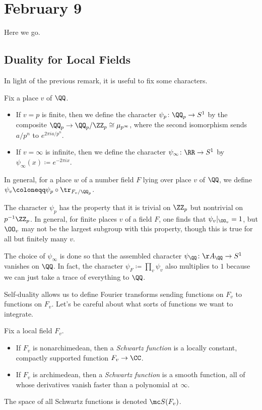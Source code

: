 \documentclass[../notes.tex]{subfiles}
\begin{document}
\section{February 9}
Here we go.

\subsection{Duality for Local Fields}
In light of the previous remark, it is useful to fix some characters.
\begin{notation}
	Fix a place $v$ of $\QQ$.
	\begin{itemize}
		\item If $v=p$ is finite, then we define the character $\psi_p\colon\QQ_p\to S^1$ by the composite $\QQ_p\to\QQ_p/\ZZ_p\cong\mu_{p^\infty}$, where the second isomorphism sends $a/p^n$ to $e^{2\pi ia/p^n}$.
		\item If $v=\infty$ is infinite, then we define the character $\psi_\infty\colon\RR\to S^1$ by $\psi_\infty(x)\coloneqq e^{-2\pi ix}$.
	\end{itemize}
	In general, for a place $w$ of a number field $F$ lying over place $v$ of $\QQ$, we define $\psi_v\coloneqq\psi_p\circ\tr_{F_v/\QQ_p}$.
\end{notation}
\begin{remark}
	The character $\psi_p$ has the property that it is trivial on $\ZZ_p$ but nontrivial on $p^{-1}\ZZ_p$. In general, for finite places $v$ of a field $F$, one finds that $\psi_v|_{\OO_v}=1$, but $\OO_v$ may not be the largest subgroup with this property, though this is true for all but finitely many $v$.
\end{remark}
\begin{remark}
	The choice of $\psi_\infty$ is done so that the assembled character $\psi_\QQ\colon\AA_\QQ\to S^1$ vanishes on $\QQ$. In fact, the character $\psi_F\coloneqq\prod_v\psi_v$ also multiplies to $1$ because we can just take a trace of everything to $\QQ$.
\end{remark}
Self-duality allows us to define Fourier transforms sending functions on $F_v$ to functions on $F_v$. Let's be careful about what sorts of functions we want to integrate.
\begin{definition}[Schwartz]
	Fix a local field $F_v$.
	\begin{itemize}
		\item If $F_v$ is nonarchimedean, then a \textit{Schwartz function} is a locally constant, compactly supported function $F_v\to\CC$.
		\item If $F_v$ is archimedean, then a \textit{Schwartz function} is a smooth function, all of whose derivatives vanish faster than a polynomial at $\infty$.
	\end{itemize}
	The space of all Schwartz functions is denoted $\mc S(F_v)$.
\end{definition}
\end{document}
